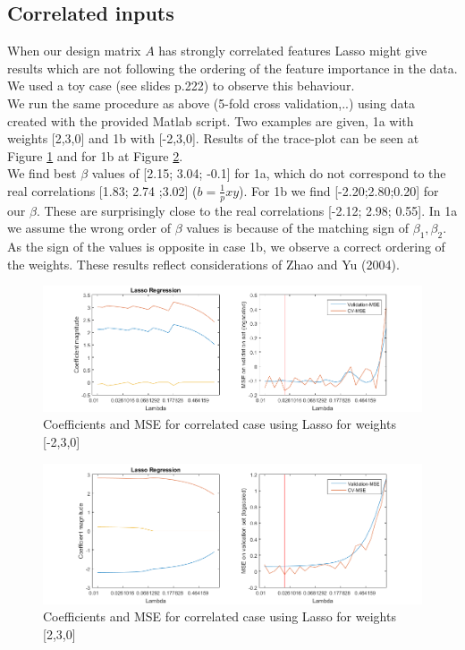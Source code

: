 \documentclass[a4paper, 11pt]{article}
\begin{document}
\subsection*{Correlated inputs}
When our design matrix $A$ has strongly correlated features Lasso might give results which are not following the ordering of the feature importance in the data. We used a toy case (see slides p.222) to observe this behaviour.\\
We run the same procedure as above (5-fold cross validation,..) using data created with the provided Matlab script. Two examples are given, 1a with weights [2,3,0] and 1b with [-2,3,0]. Results of the trace-plot can be seen at Figure \ref{img:corr} and for 1b at Figure \ref{img:corr1b}.\\We find best $\beta$ values of [2.15; 3.04; -0.1] for 1a, which do not correspond to the real correlations [1.83; 2.74 ;3.02] ($b=\frac{1}{p}xy$). For 1b we find [-2.20;2.80;0.20] for our $\beta$. These are surprisingly close to the real correlations [-2.12; 2.98; 0.55]. In 1a we assume the wrong order of $\beta$ values is because of the matching sign of $\beta_1, \beta_2$. As the sign of the values is opposite in case 1b, we observe a correct ordering of the weights. These results reflect considerations of Zhao and Yu (2004).

\begin{figure}[htbp]
\hspace{-3.5cm}
\includegraphics[scale=0.8]{correlated.png}
\caption{Coefficients and MSE for correlated case using Lasso for weights [-2,3,0]}
\label{img:corr}
\end{figure}

\begin{figure}[htbp]
\hspace{-3.5cm}
\includegraphics[scale=0.8]{correlated1b.png}
\caption{Coefficients and MSE for correlated case using Lasso for weights [2,3,0]}
\label{img:corr1b}
\end{figure}
\end{document}

